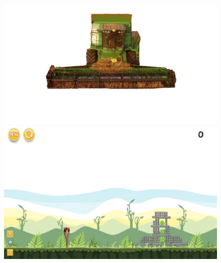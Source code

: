 \documentclass{dalthesis}
\begin{document}
\begin{figure}
  \includegraphics[width=\textwidth,height=\textheight,keepaspectratio]{levels/pictures/mechanisms/combine_harvester.jpg}
  \includegraphics[width=\textwidth,height=\textheight,keepaspectratio]{levels/screenshots/mechanisms/combine_harvester.png}
\end{figure}
\end{document}
